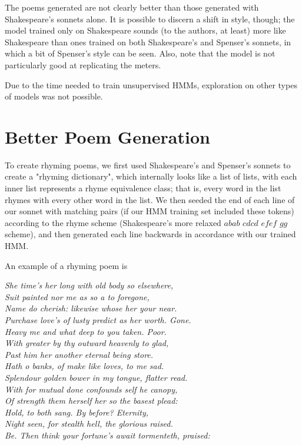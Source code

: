 \setlength{\leftskip}{0pt}

The poems generated are not clearly better than those generated with Shakespeare's sonnets alone. It is possible to discern a shift in style, though; the model trained only on Shakespeare sounds (to the authors, at least) more like Shakespeare than ones trained on both Shakespeare's and Spenser's sonnets, in which a bit of Spenser's style can be seen. Also, note that the model is not particularly good at replicating the meters.

\par Due to the time needed to train unsupervised HMMs, exploration on other types of models was not possible.


\section{Better Poem Generation}
\par To create rhyming poems, we first used Shakespeare's and Spenser's sonnets to create a "rhyming dictionary", which internally looks like a list of lists, with each inner list represents a rhyme equivalence class; that is, every word in the list rhymes with every other word in the list. We then seeded the end of each line of our sonnet with matching pairs (if our HMM training set included these tokens) according to the rhyme scheme (Shakespeare's more relaxed $abab$ $cdcd$ $efef$ $gg$ scheme), and then generated each line backwards in accordance with our trained HMM.
\par An example of a rhyming poem is

\setlength{\leftskip}{3cm}

\noindent\textit{
She time's her long with old body so elsewhere, \\
Suit painted nor me as so a to foregone, \\
Name do cherish: likewise whose her your near. \\
Purchase love's of lusty predict as her worth. Gone. \\
Heavy me and what deep to you taken. Poor. \\
With greater by thy outward heavenly to glad, \\
Past him her another eternal being store. \\
Hath o banks, of make like loves, to me sad. \\
Splendour golden bower in my tongue, flatter read. \\
With for mutual done confounds self he canopy, \\
Of strength them herself her so the basest plead: \\
Hold, to both sang. By before? Eternity, \\
Night seen, for stealth hell, the glorious raised. \\
Be. Then think your fortune's await tormenteth, praised: \\
}

